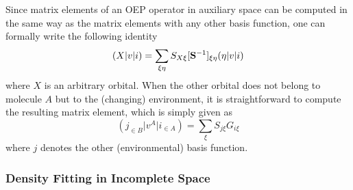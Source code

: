 Since matrix elements of an OEP operator in auxiliary space can be computed 
in the same way as the matrix elements with any other basis function, 
one can formally write the following identity
\begin{equation}
 (X \vert v\vert i) = \sum_{\xi\eta} S_{X \xi} [{\bf S}^{-1}]_{\xi\eta} (\eta\vert v\vert i)
\end{equation}
where $ X $ is an arbitrary orbital.
When the other orbital
does not belong to molecule $A$ but to the (changing) environment, it is 
straightforward to compute the resulting matrix element, which is simply given as  
\begin{equation}
   (j_{\in B} \vert v^A \vert i_{\in A}) = \sum_\xi {S_{j\xi}} {G_{i\xi}}
\end{equation}
where $j$ denotes the other (environmental) basis function.

\subsubsection{Density Fitting in Incomplete Space}


